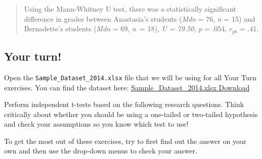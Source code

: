 \documentclass[
]{book}
\begin{document}
\begin{quote}
Using the Mann-Whitney U test, there was a statistically significant difference in grades between Anastasia's students (\emph{Mdn} = 76, \emph{n} = 15) and Bernadette's students (\emph{Mdn} = 69, \emph{n}~= 18), \emph{U = 79.50}, \emph{p} = .054, \(r_{pb}\) = .41.
\end{quote}

\hypertarget{your-turn-1}{%
\subsection{Your turn!}\label{your-turn-1}}

Open the \texttt{Sample\_Dataset\_2014.xlsx} file that we will be using for all Your Turn exercises. You can find the dataset here: \href{https://github.com/danawanzer/stats-with-jamovi/blob/master/data/Sample_Dataset_2014.xlsx}{Sample\_Dataset\_2014.xlsx Download}

Perform independent t-tests based on the following research questions. Think critically about whether you should be using a one-tailed or two-tailed hypothesis and check your assumptions so you know which test to use!

To get the most out of these exercises, try to first find out the answer on your own and then use the drop-down menus to check your answer.
\end{document}
